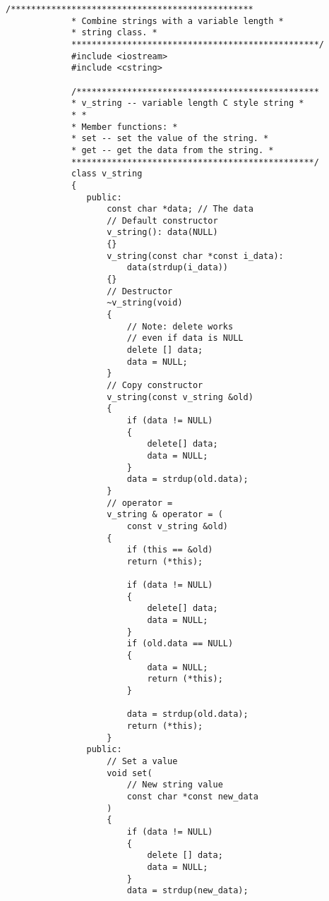 \begin{LTR}
        \begin{lstlisting}[style=C++Style]
             /************************************************
             * Combine strings with a variable length *
             * string class. *
             *************************************************/
             #include <iostream>
             #include <cstring>

             /************************************************
             * v_string -- variable length C style string *
             * *
             * Member functions: *
             * set -- set the value of the string. *
             * get -- get the data from the string. *
             ************************************************/
             class v_string
             {
             	public:
             		const char *data; // The data
             		// Default constructor
             		v_string(): data(NULL)
             		{}
             		v_string(const char *const i_data):
             			data(strdup(i_data))
             		{}
             		// Destructor
             		~v_string(void)
             		{
             			// Note: delete works
             			// even if data is NULL
             			delete [] data;
             			data = NULL;
             		}
             		// Copy constructor
             		v_string(const v_string &old)
             		{
             			if (data != NULL)
             			{
             				delete[] data;
             				data = NULL;
             			}
             			data = strdup(old.data);
             		}
             		// operator =
             		v_string & operator = (
             			const v_string &old)
             		{
             			if (this == &old)
             			return (*this);

             			if (data != NULL)
             			{
             				delete[] data;
             				data = NULL;
             			}
             			if (old.data == NULL)
             			{
             				data = NULL;
             				return (*this);
             			}

             			data = strdup(old.data);
             			return (*this);
             		}
             	public:
             		// Set a value
             		void set(
             			// New string value
             			const char *const new_data
             		)
             		{
             			if (data != NULL)
             			{
             				delete [] data;
             				data = NULL;
             			}
             			data = strdup(new_data);


\end{lstlisting}
\end{LTR}
